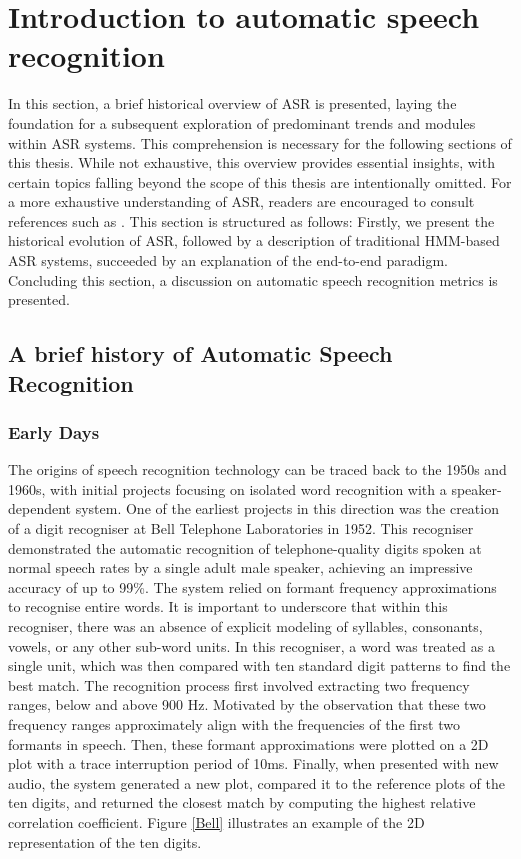 \section{Introduction to automatic speech recognition}%
In this section, a brief historical overview of \ac{ASR} is presented, laying the foundation for a subsequent exploration of predominant trends and modules within \ac{ASR} systems. This comprehension is necessary for the following sections of this thesis. While not exhaustive, this overview provides essential insights, with certain topics falling beyond the scope of this thesis are intentionally omitted. For a more exhaustive understanding of \ac{ASR}, readers are encouraged to consult references such as \cite{benzeghiba2007automatic, karpagavalli2016review, arora2012automatic}. This section is structured as follows: Firstly, we present the historical evolution of \ac{ASR}, followed by a description of traditional HMM-based \ac{ASR} systems, succeeded by an explanation of the end-to-end paradigm. Concluding this section, a discussion on automatic speech recognition metrics is presented.

\subsection{A brief history of Automatic Speech Recognition}

\subsubsection{Early Days}

The origins of speech recognition technology can be traced back to the 1950s and 1960s, with initial projects focusing on isolated word recognition with a speaker-dependent system. One of the earliest projects in this direction was the creation of a digit recogniser at Bell Telephone Laboratories in 1952. This recogniser demonstrated the automatic recognition of telephone-quality digits spoken at normal speech rates by a single adult male speaker, achieving an impressive accuracy of up to 99\%. The system relied on formant frequency approximations to recognise entire words. It is important to underscore that within this recogniser, there was an absence of explicit modeling of syllables, consonants, vowels, or any other sub-word units. In this recogniser, a word was treated as a single unit, which was then compared with ten standard digit patterns to find the best match. The recognition process first involved extracting two frequency ranges, below and above 900 \ac{Hz}. Motivated by the observation that these two frequency ranges approximately align with the frequencies of the first two formants in speech. Then, these formant approximations were plotted on a 2D plot with a trace interruption period of 10ms. Finally, when presented with new audio, the system generated a new plot, compared it to the reference plots of the ten digits, and returned the closest match by computing the highest relative correlation coefficient. Figure \ref{Bell} illustrates an example of the 2D representation of the ten digits.


